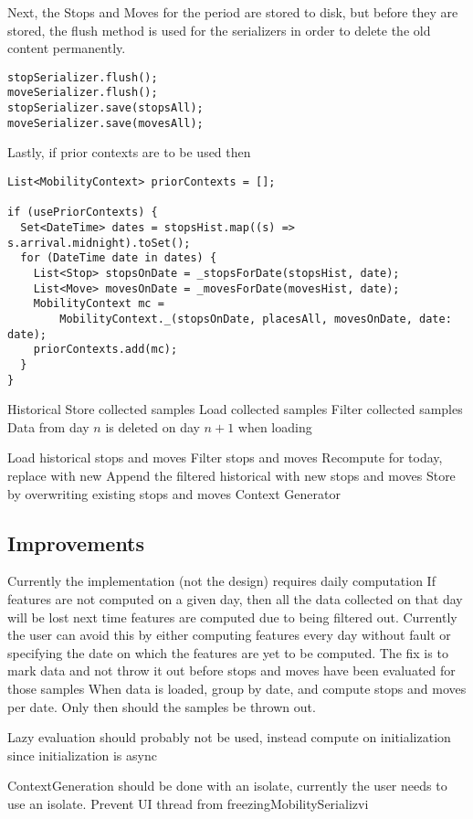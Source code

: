 Next, the Stops and Moves for the period are stored to disk, but before they are stored, the flush method is used for the serializers in order to delete the old content permanently.
\begin{verbatim}
stopSerializer.flush();
moveSerializer.flush();
stopSerializer.save(stopsAll);
moveSerializer.save(movesAll);
\end{verbatim}

Lastly, if prior contexts are to be used then 

\begin{verbatim}
List<MobilityContext> priorContexts = [];

if (usePriorContexts) {
  Set<DateTime> dates = stopsHist.map((s) => s.arrival.midnight).toSet();
  for (DateTime date in dates) {
    List<Stop> stopsOnDate = _stopsForDate(stopsHist, date);
    List<Move> movesOnDate = _movesForDate(movesHist, date);
    MobilityContext mc =
        MobilityContext._(stopsOnDate, placesAll, movesOnDate, date: date);
    priorContexts.add(mc);
  }
}
\end{verbatim}

Historical  Store collected samples
Load collected samples
Filter collected samples
Data from day $n$ is deleted on day $n+1$ when loading

Load historical stops and moves
Filter stops and moves
Recompute for today, replace with new 
Append the filtered historical with new stops and moves
Store by overwriting existing stops and moves
Context Generator


\subsection{Improvements}
Currently the implementation (not the design) requires daily computation
If features are not computed on a given day, then all the data collected on that day will be lost next time features are computed due to being filtered out. Currently the user can avoid this by either computing features every day without fault or specifying the date on which the features are yet to be computed.
The fix is to mark data and not throw it out before stops and moves have been evaluated for those samples
When data is loaded, group by date, and compute stops and moves per date. Only then should the samples be thrown out.

Lazy evaluation should probably not be used, instead compute on initialization since initialization is async

ContextGeneration should be done with an isolate, currently the user needs to use an isolate.
Prevent UI thread from freezingMobilitySerializvi